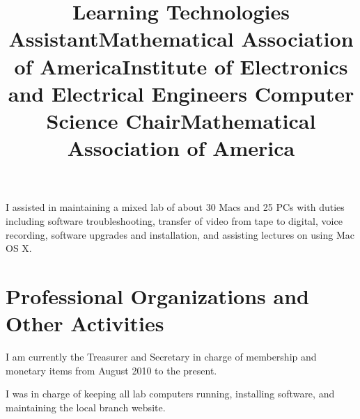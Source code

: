 \documentclass[margintitle,line]{res}
\renewcommand{\subsection}[1]{\section{\normalfont #1}}
\begin{document}
\begin{resume}
\title{Learning Technologies Assistant}
\begin{position}
 I assisted in maintaining a mixed lab of about 30 Macs and 25 PCs with duties including software troubleshooting, transfer of video from tape to digital, voice recording, software upgrades and installation, and assisting lectures on using Mac OS X.
\end{position}




\section{Professional Organizations and Other Activities}

\title{Mathematical Association of America}
\begin{position}
I am currently the Treasurer and Secretary in charge of membership and monetary items from August 2010 to the present.
\end{position}

\title{Institute of Electronics and Electrical Engineers Computer Science Chair}
\begin{position}
I was in charge of keeping all lab computers running, installing software, and maintaining the local branch website.
\end{position}

\title{Mathematical Association of America}
\begin{position}
\end{position}



\setlength{\parskip}{1ex}





\end{resume}
\end{document}
